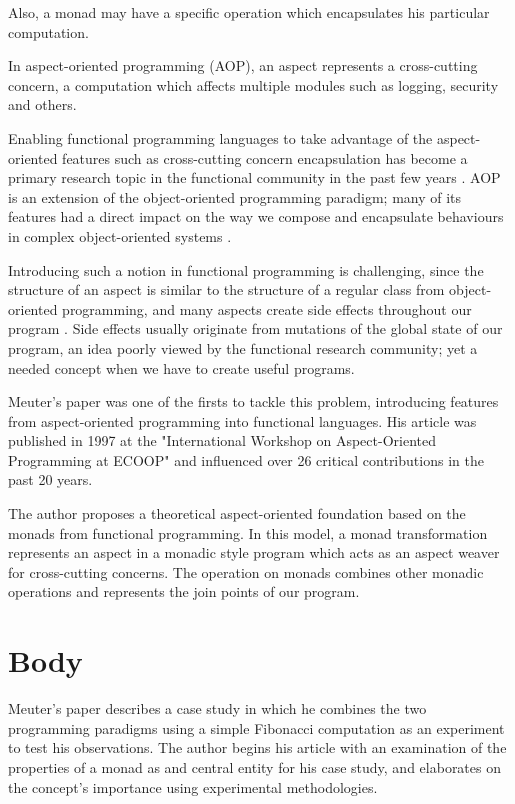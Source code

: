 \documentclass[twocolumn, 9pt]{article}
\begin{document}
Also, a monad may have a specific operation which encapsulates his particular computation. \cite{wiki:monad}

\begin{definition}
In aspect-oriented programming (AOP), an aspect represents a cross-cutting concern, a computation which affects multiple modules such as logging, security and others. \cite{wiki:aspect}
\end{definition}

Enabling functional programming languages to take advantage of the aspect-oriented features such as cross-cutting concern encapsulation has become a primary research topic in the functional community in the past few years \cite{aopfpi}. AOP is an extension of the object-oriented programming paradigm; many of its features had a direct impact on the way we compose and encapsulate behaviours in complex object-oriented systems \cite{wiki:aspect}.

Introducing such a notion in functional programming is challenging, since the structure of an aspect is similar to the structure of a regular class from object-oriented programming, and many aspects create side effects throughout our program \cite{aopfpi}. Side effects usually originate from mutations of the global state of our program, an idea poorly viewed by the functional research community; yet a needed concept when we have to create useful programs.

Meuter's paper was one of the firsts to tackle this problem, introducing features from aspect-oriented programming into functional languages. His article was published in 1997 at the "International Workshop on Aspect-Oriented Programming at ECOOP" and influenced over 26 critical contributions in the past 20 years.

The author proposes a theoretical aspect-oriented foundation based on the monads from functional programming. In this model, a monad transformation represents an aspect in a monadic style program which acts as an aspect weaver for cross-cutting concerns. The  operation on monads combines other monadic operations and represents the join points of our program.

\section{Body}

Meuter's paper describes a case study in which he combines the two programming paradigms using a simple Fibonacci computation as an experiment to test his observations. The author begins his article with an examination of the properties of a monad as and central entity for his case study, and elaborates on the concept's importance using experimental methodologies.
\end{document}
